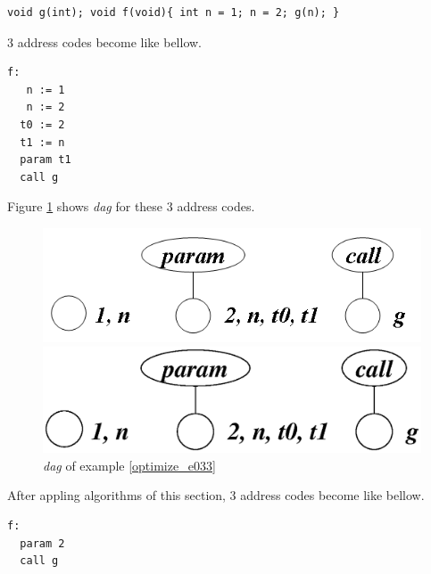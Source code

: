 \begin{Example}
\label{optimize_e033}
\begin{verbatim}
void g(int); void f(void){ int n = 1; n = 2; g(n); }
\end{verbatim}
3 address codes become like bellow.
\begin{verbatim}
f:
   n := 1
   n := 2
  t0 := 2
  t1 := n
  param t1
  call g
\end{verbatim}
Figure \ref{optimize_e034} shows {\em dag} for these 3 address codes.
\begin{figure}[htbp]
\begin{center}
\begin{htmlonly}
\includegraphics[width=0.8\linewidth,height=0.247\linewidth]{opt018.png}
\end{htmlonly}
\begin{latexonly}
\includegraphics[width=0.8\linewidth,height=0.247\linewidth]{opt018.eps}
\end{latexonly}
\caption{{\em dag} of example \ref{optimize_e033}}
\label{optimize_e034}
\end{center}
\end{figure}
After appling algorithms of this section,
3 address codes become like bellow.
\begin{verbatim}
f:
  param 2
  call g
\end{verbatim}
\end{Example}

